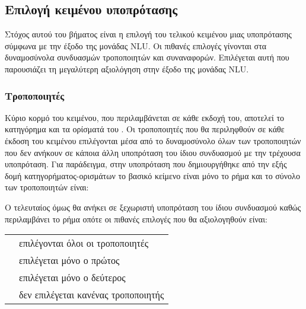 \subsection{Επιλογή κειμένου υποπρότασης}\label{subsec:4-powerset}
Στόχος αυτού του βήματος είναι η επιλογή του τελικού κειμένου μιας υποπρότασης σύμφωνα με την έξοδο της μονάδας NLU.
Οι πιθανές επιλογές γίνονται στα δυναμοσύνολα συνδυασμών τροποποιητών και συναναφορών.
Επιλέγεται αυτή που παρουσιάζει τη μεγαλύτερη αξιολόγηση στην έξοδο της μονάδας NLU.

\subsubsection{Τροποποιητές}
Κύριο κορμό του κειμένου, που περιλαμβάνεται σε κάθε εκδοχή του, αποτελεί το κατηγόρημα και τα ορίσματά του \ARGs{}.
Οι τροποποιητές \ARGM{} που θα περιληφθούν σε κάθε έκδοση του κειμένου επιλέγονται μέσα από το δυναμοσύνολο όλων των τροποποιητών που δεν ανήκουν σε κάποια άλλη υποπρόταση του ίδιου συνδυασμού με την τρέχουσα υποπρόταση.
Για παράδειγμα, στην υποπρόταση που δημιουργήθηκε από την εξής δομή κατηγορήματος-ορισμάτων
το βασικό κείμενο είναι μόνο το ρήμα \engquote{[V: move]}
και το σύνολο των τροποποιητών είναι:
\begin{compactenum}
    \item {}
    \item {}
    \item {}
\end{compactenum}
Ο τελευταίος όμως θα ανήκει σε ξεχωριστή υποπρόταση του ίδιου συνδυασμού καθώς περιλαμβάνει το ρήμα 
οπότε οι πιθανές επιλογές που θα αξιολογηθούν είναι:\\
\begin{tabulary}{\linewidth}{L @{ --- } L}
     & επιλέγονται όλοι οι τροποποιητές    \\
              & επιλέγεται μόνο ο πρώτος            \\
          & επιλέγεται μόνο ο δεύτερος          \\
                   & δεν επιλέγεται κανένας τροποποιητής
\end{tabulary}

